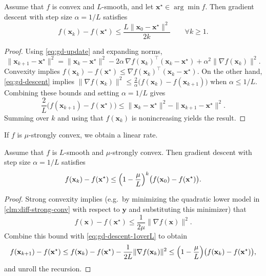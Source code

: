 \begin{theorem}
\label{thm:convex-sublinear-rate}
Assume that $f$ is convex and $L$-smooth, and let $\mathbf{x}^\star\in\arg\min f$.
Then gradient descent with step size $\alpha=1/L$ satisfies
\[
  f(\mathbf{x}_k)-f(\mathbf{x}^\star)\le \frac{L\|\mathbf{x}_0-\mathbf{x}^\star\|^2}{2k}
  \qquad \forall k\ge 1.
\]
\end{theorem}
\begin{proof}
Using \eqref{eq:gd-update} and expanding norms,
\[
  \|\mathbf{x}_{k+1}-\mathbf{x}^\star\|^2
  =\|\mathbf{x}_k-\mathbf{x}^\star\|^2
  -2\alpha\,\nabla f(\mathbf{x}_k)^\top(\mathbf{x}_k-\mathbf{x}^\star)
  +\alpha^2\|\nabla f(\mathbf{x}_k)\|^2.
\]
Convexity implies
$f(\mathbf{x}_k)-f(\mathbf{x}^\star)\le \nabla f(\mathbf{x}_k)^\top(\mathbf{x}_k-\mathbf{x}^\star)$.
On the
other hand, \eqref{eq:gd-descent} implies
$\|\nabla f(\mathbf{x}_k)\|^2\le \frac{2}{\alpha}\bigl(f(\mathbf{x}_k)-f(\mathbf{x}_{k+1})\bigr)$ when
$\alpha\le 1/L$. Combining these bounds and setting $\alpha=1/L$ gives
\[
  \frac{2}{L}\bigl(f(\mathbf{x}_{k+1})-f(\mathbf{x}^\star)\bigr)
  \le \|\mathbf{x}_k-\mathbf{x}^\star\|^2-\|\mathbf{x}_{k+1}-\mathbf{x}^\star\|^2.
\]
Summing over $k$ and using that $f(\mathbf{x}_k)$ is nonincreasing yields the result.
\end{proof}


\noindent If $f$ is $\mu$-strongly convex, we obtain a linear rate.
\begin{theorem}
\label{thm:linear-rate}
Assume that $f$ is $L$-smooth and $\mu$-strongly convex. Then gradient descent
with step size $\alpha=1/L$ satisfies
\[
  f(\mathbf{x}_k)-f(\mathbf{x}^\star)
  \le \Bigl(1-\frac{\mu}{L}\Bigr)^k\bigl(f(\mathbf{x}_0)-f(\mathbf{x}^\star)\bigr).
\]
\end{theorem}
\begin{proof}
Strong convexity implies (e.g.\ by minimizing the quadratic lower model in
\cref{clm:diff-strong-conv} with respect to $\mathbf{y}$ and substituting this minimizer) that
\[
  f(\mathbf{x})-f(\mathbf{x}^\star)\le \frac{1}{2\mu}\|\nabla f(\mathbf{x})\|^2.
\]
Combine this bound with \eqref{eq:gd-descent-1overL} to obtain
\[
  f(\mathbf{x}_{k+1})-f(\mathbf{x}^\star)
  \le f(\mathbf{x}_k)-f(\mathbf{x}^\star)-\frac{1}{2L}\|\nabla f(\mathbf{x}_k)\|^2
  \le \Bigl(1-\frac{\mu}{L}\Bigr)\bigl(f(\mathbf{x}_k)-f(\mathbf{x}^\star)\bigr),
\]
and unroll the recursion.
\end{proof}

